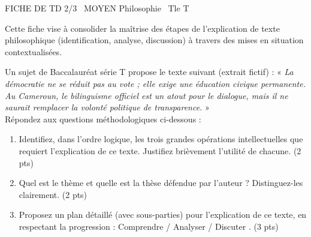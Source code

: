 \documentclass[11pt]{article}
\begin{document}
\begin{tcolorbox}[enhanced,colback=popink,colframe=popink,arc=10pt,boxrule=0pt,left=12pt,right=12pt,top=9pt,bottom=9pt]
{\color{white}\popxbold\small FICHE DE TD 2/3 \textbullet\ MOYEN \hfill Philosophie \textbullet\ Tle T\par}
\end{tcolorbox}
\vspace{4pt}
\noindent Cette fiche vise à consolider la maîtrise des étapes de l'explication de texte philosophique (identification, analyse, discussion) à travers des mises en situation contextualisées.

\begin{exercice}
Un sujet de Baccalauréat série T propose le texte suivant (extrait fictif) : « \textit{La démocratie ne se réduit pas au vote ; elle exige une éducation civique permanente. Au Cameroun, le bilinguisme officiel est un atout pour le dialogue, mais il ne saurait remplacer la volonté politique de transparence.} »\\
Répondez aux questions méthodologiques ci-dessous :
\begin{enumerate}
    \item Identifiez, dans l'ordre logique, les trois grandes opérations intellectuelles que requiert l'explication de ce texte. Justifiez brièvement l'utilité de chacune. (2 pts)
    \item Quel est le \og thème \fg{} et quelle est la \og thèse \fg{} défendue par l'auteur ? Distinguez-les clairement. (2 pts)
    \item Proposez un plan détaillé (avec sous-parties) pour l'explication de ce texte, en respectant la progression : \og Comprendre / Analyser / Discuter \fg{}. (3 pts)
\end{enumerate}
\end{exercice}
\end{document}

